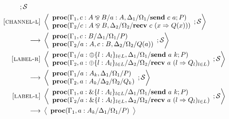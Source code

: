 \documentclass[12pt, openany]{memoir}
\newcommand*{\pare}[0]{\mathbin{\bindnasrepma}}
\newcommand*{\send}[2]{\textbf{send}\ #1\ #2}
\newcommand*{\recv}[2]{\textbf{recv}\ #1\ #2}
\newcommand*{\procObj}[4]{\textbf{proc}(#1/#2/#3/#4)}
\newcommand*{\cancelSet}[0]{\mathcal{S}}
\begin{document}
\begin{figure}[H]
\begin{alignat}{2}
{      ; \cancelSet 
    } \tag*{} \\
    \label{channel-reduction-l} \textsc{[channel-l]} & ~ 
      \Braket{
        \begin{array}{l}
          \procObj{\Gamma_1, c : A \pare B}{a : A, \Delta_1}{\Omega_1}{\send{c}{a}; P} \\
          \procObj{\Gamma_2}{c : A \pare B, \Delta_2}{\Omega_2}{\recv{c}{(x \Rightarrow Q(x))}}
        \end{array}
        ; \cancelSet
      } \tag*{} \\ ~ \longrightarrow & ~ 
      \Braket{
        \begin{array}{l}
          \procObj{\Gamma_1, c : B}{\Delta_1}{\Omega_1}{P} \\
          \procObj{\Gamma_2}{a : A, c : B, \Delta_2}{\Omega_2}{Q(a)}
        \end{array}
        ; \cancelSet
    } \tag*{} \\
    \label{label-reduction-r} \textsc{[label-r]} & ~ 
      \Braket{
        \begin{array}{l}
          \procObj{\Gamma_1}{a : \oplus\{l : A_l\}_{l \in L}, \Delta_1}{\Omega_1}{\send{a}{k}; P} \\
          \procObj{\Gamma_2, a : \oplus\{l : A_l\}_{l \in L}}{\Delta_2}{\Omega_2}{\recv{a}{(l \Rightarrow Q_l)_{l \in L}}}
        \end{array}
        ; \cancelSet
      } \tag*{} \\ ~ \longrightarrow & ~ 
      \Braket{
        \begin{array}{l}
          \procObj{\Gamma_1}{a : A_k, \Delta_1}{\Omega_1}{P} \\
          \procObj{\Gamma_2, a : A_k}{\Delta_2}{\Omega_2}{Q_k}
        \end{array}
        ; \cancelSet
    } \tag*{} \\
    \label{label-reduction-l} \textsc{[label-l]} & ~ 
      \Braket{
        \begin{array}{l}
          \procObj{\Gamma_1, a : \&\{l : A_l\}_{l \in L}}{\Delta_1}{\Omega_1}{\send{a}{k}; P} \\
          \procObj{\Gamma_2}{a : \&\{l : A_l\}_{l \in L}, \Delta_2}{\Omega_2}{\recv{a}{(l \Rightarrow Q_l)_{l \in L}}}
        \end{array}
        ; \cancelSet
      } \tag*{} \\ ~ \longrightarrow & ~ 
      \Braket{
        \begin{array}{l}
          \procObj{\Gamma_1, a : A_k}{\Delta_1}{\Omega_1}{P} \\

\end{array}}
\end{alignat}
\end{figure}
\end{document}
